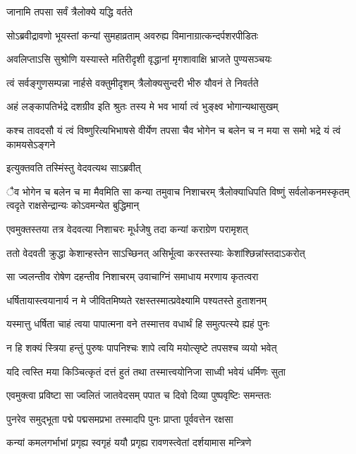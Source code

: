 \onelineshloka
{जानामि तपसा सर्वं त्रैलोक्ये यद्धि वर्तते} %

\twolineshloka
{सोऽब्रवीद्रावणो भूयस्तां कन्यां सुमहाव्रताम्}
{अवरुह्य विमानाग्रात्कन्दर्पशरपीडितः} %

\twolineshloka
{अवलिप्ताऽसि सुश्रोणि यस्यास्ते मतिरीदृशी}
{वृद्धानां मृगशावाक्षि भ्राजते पुण्यसञ्चयः} %

\twolineshloka
{त्वं सर्वङ्गुणसम्पन्ना नार्हसे वक्तुमीदृशम्}
{त्रैलोक्यसुन्दरी भीरु यौवनं ते निवर्तते} %

\twolineshloka
{अहं लङ्कापतिर्भद्रे दशग्रीव इति श्रुतः}
{तस्य मे भव भार्या त्वं भुङ्क्ष्व भोगान्यथासुखम्} %

\twolineshloka
{कश्च तावदसौ यं त्वं विष्णुरित्यभिभाषसे}
{वीर्येण तपसा चैव भोगेन च बलेन च न मया स समो भद्रे यं त्वं कामयसेऽङ्गने} %

\onelineshloka
{इत्युक्तवति तस्मिंस्तु वेदवत्यथ साऽब्रवीत्} %

\threelineshloka
{ैव भोगेन च बलेन च मा मैवमिति सा कन्या तमुवाच निशाचरम्}
{त्रैलोक्याधिपति विष्णुं सर्वलोकनमस्कृतम्}
{त्वदृते राक्षसेन्द्रान्यः कोऽवमन्येत बुद्धिमान्} %

\twolineshloka
{एवमुक्तस्तया तत्र वेदवत्या निशाचरः}
{मूर्धजेषु तदा कन्यां कराग्रेण परामृशत्} %

\twolineshloka
{ततो वेदवती क्रुद्धा केशान्हस्तेन साऽच्छिनत्}
{असिर्भूत्वा करस्तस्याः केशांश्छिन्नांस्तदाऽकरोत्} %

\twolineshloka
{सा ज्वलन्तीव रोषेण दहन्तीव निशाचरम्}
{उवाचाग्निं समाधाय मरणाय कृतत्वरा} %

\twolineshloka
{धर्षितायास्त्वयानार्य न मे जीवितमिष्यते}
{रक्षस्तस्मात्प्रवेक्ष्यामि पश्यतस्ते हुताशनम्} %

\twolineshloka
{यस्मात्तु धर्षिता चाहं त्वया पापात्मना वने}
{तस्मात्तव वधार्थं हि समुत्पत्स्ये ह्यहं पुनः} %

\twolineshloka
{न हि शक्यं स्त्रिया हन्तुं पुरुषः पापनिश्चः}
{शापे त्वयि मयोत्सृष्टे तपसश्च व्ययो भवेत्} %

\twolineshloka
{यदि त्वस्ति मया किञ्चित्कृतं दत्तं हुतं तथा}
{तस्मात्त्वयोनिजा साध्वी भवेयं धर्मिणः सुता} %

\twolineshloka
{एवमुक्त्वा प्रविष्टा सा ज्वलितं जातवेदसम्}
{पपात च दिवो दिव्या पुष्पवृष्टिः समन्ततः} %

\twolineshloka
{पुनरेव समुद्भूता पद्मे पद्मसमप्रभा}
{तस्मादपि पुनः प्राप्ता पूर्ववत्तेन रक्षसा} %

\twolineshloka
{कन्यां कमलगर्भाभां प्रगृह्य स्वगृहं ययौ}
{प्रगृह्य रावणस्त्वेतां दर्शयामास मन्त्रिणे} %

